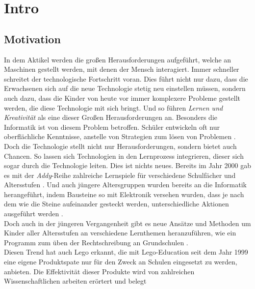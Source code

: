 \chapter{Intro}


\section{Motivation}

In dem Aktikel  werden die großen Herausforderungen aufgeführt, welche an Maschinen gestellt werden, mit denen der Mensch interagiert. Immer schneller schreitet der technologische Fortschritt voran. Dies führt nicht nur dazu, dass die Erwachsenen sich auf die neue Technologie stetig neu einstellen müssen, sondern auch dazu, dass die Kinder von heute vor immer komplexere Probleme gestellt werden, die diese Technologie mit sich bringt. Und so führen \citeauthor{stephanidis_seven_2019} \textit{Lernen und Kreativität} als eine dieser Großen Herausforderungen an. Besonders die Informatik ist von diesem Problem betroffen. Schüler entwickeln oft nur oberflächliche Kenntnisse, anstelle von Strategien zum lösen von Problemen \cite{kazimoglu_serious_2012}.\\
Doch die Technologie stellt nicht nur Herausforderungen, sondern bietet auch Chancen. So lassen sich Technologien in den Lernprozess integrieren, dieser sich sogar durch die Technologie leiten. Dies ist nichts neues. Bereits im Jahr 2000 gab es mit der \textit{Addy}-Reihe zahlreiche Lernspiele für verschiedene Schulfächer und Altersstufen \cite{addy}. Und auch jüngere Altersgruppen wurden bereits an die Informatik herangeführt, indem Bausteine so mit Elektronik versehen wurden, dass je nach dem wie die Steine aufeinander gesteckt werden, unterschiedliche Aktionen ausgeführt werden \cite{wyeth_tangible_2002}. \\
Doch auch in der jüngeren Vergangenheit gibt es neue Ansätze und Methoden um Kinder aller Altersstufen an verschiedene Lernthemen heranzuführen, wie ein Programm zum üben der Rechtschreibung an Grundschulen \cite{berkling_learning_2020}.\\
Diesen Trend hat auch \gls{Lego} erkannt, die mit \gls{Lego}-Education seit dem Jahr 1999 eine eigene Produktspate nur für den Zweck an Schulen eingesetzt zu werden, anbieten. Die Effektivität dieser Produkte wird von zahlreichen Wissenschaftlichen arbeiten erörtert und belegt \cite{perez_new_2015, karatrantou_algorithm_2008, jun_design_2016, cuellar_design_2014, klassner_lego_2003}\\
